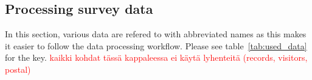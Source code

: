 \newpage
\subsection{Processing survey data}
\label{sec:c3-processdata} %
\justify

In this section, various data are refered to with abbreviated names as this makes it easier to follow the data processing workflow. Please see table~\ref{tab:used_data} for the key. \textcolor{red}{kaikki kohdat tässä kappaleessa ei käytä lyhenteitä (records, visitors, postal)}

